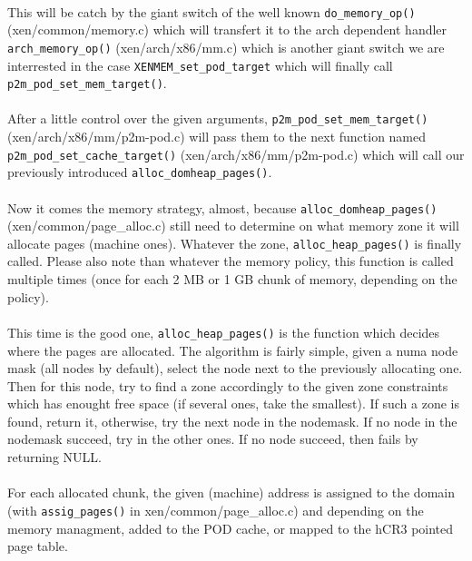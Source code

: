 \paragraph{}
This will be catch by the giant switch of the well known \verb!do_memory_op()!
(xen/common/memory.c) which will transfert it to the arch dependent handler
\verb!arch_memory_op()! (xen/arch/x86/mm.c) which is another giant switch we
are interrested in the case \verb!XENMEM_set_pod_target! which will finally
call \verb!p2m_pod_set_mem_target()!.

\paragraph{}
After a little control over the given arguments,
\verb!p2m_pod_set_mem_target()! (xen/arch/x86/mm/p2m-pod.c) will pass them to
the next function named \verb!p2m_pod_set_cache_target()! (xen/arch/x86/mm/p2m-pod.c)
which will call our previously introduced \verb!alloc_domheap_pages()!.

\paragraph{}
Now it comes the memory strategy, almost, because \verb!alloc_domheap_pages()!
(xen/common/page\_alloc.c) still need to determine on what memory zone it
will allocate pages (machine ones).
Whatever the zone, \verb!alloc_heap_pages()! is finally called.
Please also note than whatever the memory policy, this function is called
multiple times (once for each 2 MB or 1 GB chunk of memory, depending on the
policy).

\paragraph{}
This time is the good one, \verb!alloc_heap_pages()! is the function which
decides where the pages are allocated.
The algorithm is fairly simple, given a numa node mask (all nodes by default),
select the node next to the previously allocating one.
Then for this node, try to find a zone accordingly to the given zone
constraints which has enought free space (if several ones, take the smallest).
If such a zone is found, return it, otherwise, try the next node in the
nodemask.
If no node in the nodemask succeed, try in the other ones.
If no node succeed, then fails by returning NULL.

\paragraph{}
For each allocated chunk, the given (machine) address is assigned to the
domain (with \verb!assig_pages()! in xen/common/page\_alloc.c) and depending
on the memory managment, added to the POD cache, or mapped to the hCR3 pointed
page table.
